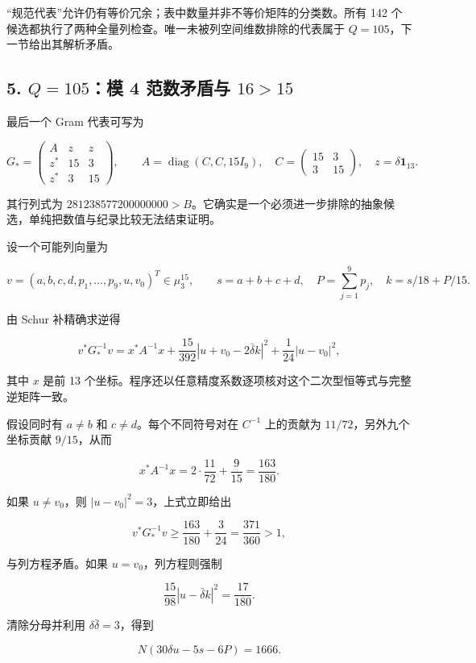 \documentclass[
  11pt,
  a4paper,
]{article}
\begin{document}
``规范代表''允许仍有等价冗余；表中数量并非不等价矩阵的分类数。所有 142
个候选都执行了两种全量列检查。唯一未被列空间维数排除的代表属于
\(Q=105\)，下一节给出其解析矛盾。

\subsection{\texorpdfstring{5. \(Q=105\)：模 4 范数矛盾与
\(16>15\)}{5. Q=105：模 4 范数矛盾与 16\textgreater15}}\label{q105ux6a21-4-ux8303ux6570ux77dbux76feux4e0e-1615}

最后一个 Gram 代表可写为

\[G_*=
\begin{pmatrix}A&z&z\\z^*&15&3\\z^*&3&15\end{pmatrix},\qquad
A=\operatorname{diag}(C,C,15I_9),\quad
C=\begin{pmatrix}15&3\\3&15\end{pmatrix},\quad z=\delta\mathbf1_{13}.\]

其行列式为
\(281238577200000000>B\)。它确实是一个必须进一步排除的抽象候选，单纯把数值与纪录比较无法结束证明。

设一个可能列向量为

\[v=(a,b,c,d,p_1,\ldots,p_9,u,v_0)^T\in\mu_3^{15},\qquad
s=a+b+c+d,\quad P=\sum_{j=1}^9p_j,\quad k=s/18+P/15.\]

由 Schur 补精确求逆得

\[v^*G_*^{-1}v
=x^*A^{-1}x+\frac{15}{392}|u+v_0-2\bar\delta k|^2
+\frac1{24}|u-v_0|^2,\]

其中 \(x\) 是前 13
个坐标。程序还以任意精度系数逐项核对这个二次型恒等式与完整逆矩阵一致。

假设同时有 \(a\ne b\) 和 \(c\ne d\)。每个不同符号对在 \(C^{-1}\)
上的贡献为 \(11/72\)，另外九个坐标贡献 \(9/15\)，从而

\[x^*A^{-1}x=2\cdot\frac{11}{72}+\frac9{15}=\frac{163}{180}.\]

如果 \(u\ne v_0\)，则 \(|u-v_0|^2=3\)，上式立即给出

\[v^*G_*^{-1}v\ge\frac{163}{180}+\frac3{24}
=\frac{371}{360}>1,\]

与列方程矛盾。如果 \(u=v_0\)，列方程则强制

\[\frac{15}{98}|u-\bar\delta k|^2=\frac{17}{180}.\]

清除分母并利用 \(\delta\bar\delta=3\)，得到

\[\boxed{N(30\delta u-5s-6P)=1666.}\]
\end{document}
